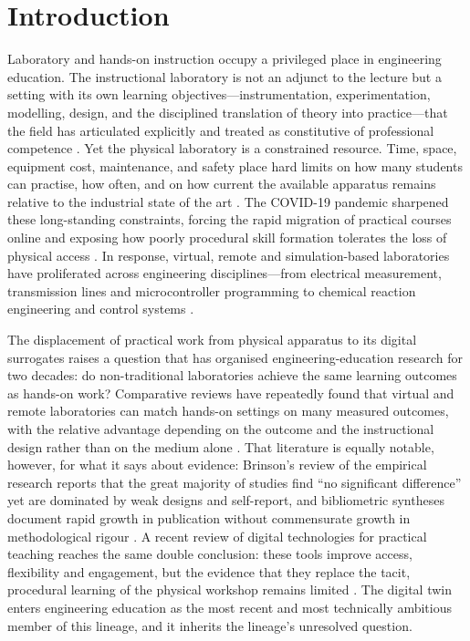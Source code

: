 \section{Introduction}\label{introduction}

Laboratory and hands-on instruction occupy a privileged place in engineering
education. The instructional laboratory is not an adjunct to the lecture but a
setting with its own learning objectives---instrumentation, experimentation,
modelling, design, and the disciplined translation of theory into practice---that
the field has articulated explicitly and treated as constitutive of professional
competence \citep{feisel_role_2005, lei_teaching_2022, naukkarinen_supporting_2018}.
Yet the physical laboratory is a constrained resource. Time, space, equipment
cost, maintenance, and safety place hard limits on how many students can practise,
how often, and on how current the available apparatus remains relative to the
industrial state of the art \citep{lei_teaching_2022, prichetnikov_investigation_2020}.
The COVID-19 pandemic sharpened these long-standing constraints, forcing the rapid
migration of practical courses online and exposing how poorly procedural skill
formation tolerates the loss of physical access \citep{haase_teaching_2022, alkhedher_interactive_2021}. In response, virtual, remote and simulation-based
laboratories have proliferated across engineering disciplines---from electrical
measurement, transmission lines and microcontroller programming to chemical
reaction engineering and control systems \citep{chumchuen_remote_2023, andrieu_remote_2021, panagiotakis_remote_2022, naukkarinen_supporting_2018, lei_teaching_2022}.

The displacement of practical work from physical apparatus to its digital
surrogates raises a question that has organised engineering-education research for
two decades: do non-traditional laboratories achieve the same learning outcomes as
hands-on work? Comparative reviews have repeatedly found that virtual and remote
laboratories can match hands-on settings on many measured outcomes, with the
relative advantage depending on the outcome and the instructional design rather
than on the medium alone \citep{ma_handson_2006, corter_constructing_2007, lindsay_effects_2005, brinson_learning_2015}. That literature is equally
notable, however, for what it says about evidence: Brinson's review of the
empirical research reports that the great majority of studies find ``no significant
difference'' yet are dominated by weak designs and self-report, and bibliometric
syntheses document rapid growth in publication without commensurate growth in
methodological rigour \citep{brinson_learning_2015, heradio_virtual_2016, potkonjak_virtual_2016}. A recent review of digital technologies for practical
teaching reaches the same double conclusion: these tools improve access,
flexibility and engagement, but the evidence that they replace the tacit,
procedural learning of the physical workshop remains limited
\citep{maladzhi_digital_2025}. The digital twin enters engineering education as the
most recent and most technically ambitious member of this lineage, and it inherits
the lineage's unresolved question.

